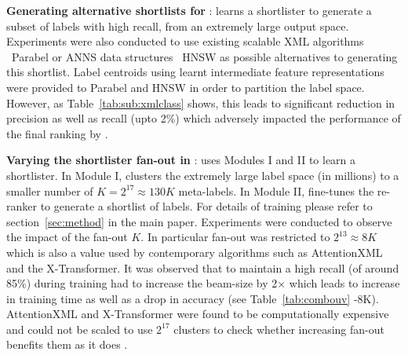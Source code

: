 \textbf{Generating alternative shortlists for \alg}: \alg learns a shortlister to generate a subset of labels with high recall, from an extremely large output space. Experiments were also conducted to use existing scalable XML algorithms \eg~Parabel or ANNS data structures \eg~HNSW as possible alternatives to generating this shortlist. Label centroids using learnt intermediate feature representations were provided to Parabel and HNSW in order to partition the label space. However, as Table~\ref{tab:sub:xmlclass} shows, this leads to significant reduction in precision as well as recall (upto 2\%) which adversely impacted the performance of the final ranking by \alg.

\textbf{Varying the shortlister fan-out in \alg}: \alg uses  Modules I and II to learn a shortlister. In Module I, \alg clusters the extremely large label space (in millions) to a smaller number of $K = 2^{17} \approx 130K$ meta-labels. In Module II, \alg fine-tunes the re-ranker to generate a shortlist of labels. For details of training please refer to section~\ref{sec:method} in the main paper. Experiments were conducted to observe the impact of the fan-out $K$. In particular fan-out was restricted to $2^{13} \approx 8K$ which is also a value used by contemporary algorithms such as AttentionXML and the X-Transformer. It was observed that to maintain a high recall (of around 85\%) during training \alg had to increase the beam-size by 2$\times$ which leads to increase in training time as well as a drop in accuracy (see Table~\ref{tab:combouv} \alg-8K). AttentionXML and X-Transformer were found to be computationally expensive and could not be scaled to use $2^{17}$ clusters to check whether increasing fan-out benefits them as it does \alg.


